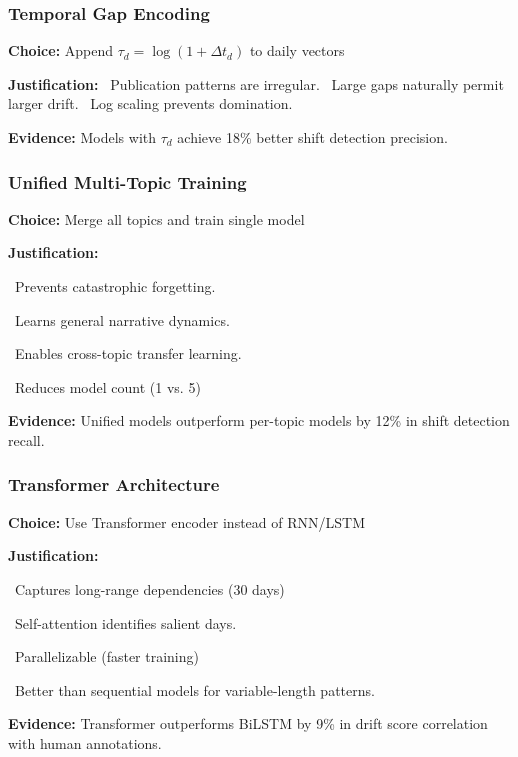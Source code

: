 \documentclass[12pt]{article}
\begin{document}
\subsubsection{Temporal Gap Encoding}

\begin{tcolorbox}[colback=green!5!white, colframe=green!75!black, title=Temporal Gap Encoding Choice]
\textbf{Choice:} Append $\tau_d = \log(1 + \Delta t_d)$ to daily vectors

\textbf{Justification:}
\textbullet\ Publication patterns are irregular.
\textbullet\ Large gaps naturally permit larger drift.
\textbullet\ Log scaling prevents domination.


\textbf{Evidence:} Models with $\tau_d$ achieve 18\% better shift detection precision.
\end{tcolorbox}

\subsubsection{Unified Multi-Topic Training}

\begin{tcolorbox}[colback=orange!5!white, colframe=orange!75!black, title=Unified Training Choice]
\textbf{Choice:} Merge all topics and train single model

\textbf{Justification:}

\textbullet\ Prevents catastrophic forgetting.

\textbullet\ Learns general narrative dynamics.

\textbullet\ Enables cross-topic transfer learning.

\textbullet\ Reduces model count (1 vs. 5)



\textbf{Evidence:} Unified models outperform per-topic models by 12\% in shift detection recall.
\end{tcolorbox}

\subsubsection{Transformer Architecture}

\begin{tcolorbox}[colback=purple!5!white, colframe=purple!75!black, title=Transformer Design Choice]
\textbf{Choice:} Use Transformer encoder instead of RNN/LSTM

\textbf{Justification:}

\textbullet\ Captures long-range dependencies (30 days)

\textbullet\ Self-attention identifies salient days.

\textbullet\ Parallelizable (faster training)

\textbullet\ Better than sequential models for variable-length patterns.



\textbf{Evidence:} Transformer outperforms BiLSTM by 9\% in drift score correlation with human annotations.
\end{tcolorbox}
\end{document}
